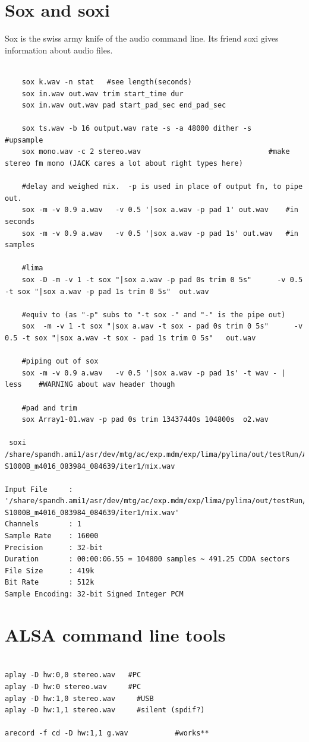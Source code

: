 \documentclass[oneside,english]{scrbook}
\begin{document}
\section{Sox and soxi}
Sox is the swiss army knife of the audio command line. Its friend soxi gives information about audio files.
\begin{lstlisting}

	sox k.wav -n stat   #see length(seconds)
	sox in.wav out.wav trim start_time dur			
	sox in.wav out.wav pad start_pad_sec end_pad_sec

	sox ts.wav -b 16 output.wav rate -s -a 48000 dither -s    #upsample
	sox mono.wav -c 2 stereo.wav                              #make stereo fm mono (JACK cares a lot about right types here)

	#delay and weighed mix.  -p is used in place of output fn, to pipe out.
	sox -m -v 0.9 a.wav   -v 0.5 '|sox a.wav -p pad 1' out.wav    #in seconds
	sox -m -v 0.9 a.wav   -v 0.5 '|sox a.wav -p pad 1s' out.wav   #in samples

	#lima
	sox -D -m -v 1 -t sox "|sox a.wav -p pad 0s trim 0 5s"      -v 0.5 -t sox "|sox a.wav -p pad 1s trim 0 5s"  out.wav
 
	#equiv to (as "-p" subs to "-t sox -" and "-" is the pipe out)
	sox  -m -v 1 -t sox "|sox a.wav -t sox - pad 0s trim 0 5s"      -v 0.5 -t sox "|sox a.wav -t sox - pad 1s trim 0 5s"   out.wav
	
	#piping out of sox
	sox -m -v 0.9 a.wav   -v 0.5 '|sox a.wav -p pad 1s' -t wav - | less    #WARNING about wav header though

	#pad and trim
	sox Array1-01.wav -p pad 0s trim 13437440s 104800s  o2.wav

 soxi  /share/spandh.ami1/asr/dev/mtg/ac/exp.mdm/exp/lima/pylima/out/testRun/AMI-S1000B_m4016_083984_084639/iter1/mix.wav

Input File     : '/share/spandh.ami1/asr/dev/mtg/ac/exp.mdm/exp/lima/pylima/out/testRun/AMI-S1000B_m4016_083984_084639/iter1/mix.wav'
Channels       : 1
Sample Rate    : 16000
Precision      : 32-bit
Duration       : 00:00:06.55 = 104800 samples ~ 491.25 CDDA sectors
File Size      : 419k
Bit Rate       : 512k
Sample Encoding: 32-bit Signed Integer PCM

\end{lstlisting}

\section{ALSA command line tools}
\begin{lstlisting}

aplay -D hw:0,0 stereo.wav   #PC
aplay -D hw:0 stereo.wav     #PC
aplay -D hw:1,0 stereo.wav     #USB
aplay -D hw:1,1 stereo.wav     #silent (spdif?)

arecord -f cd -D hw:1,1 g.wav           #works**

\end{lstlisting}
\end{document}
